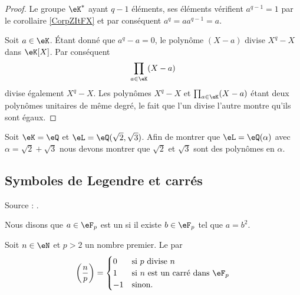 \begin{proof}
    Le groupe \( \eK^*\) ayant \( q-1\) éléments, ses éléments vérifient \( a^{q-1}=1\) par le corollaire \ref{CorpZItFX} et par conséquent \( a^q=aa^{q-1}=a \).

    Soit \( a\in \eK\). Étant donné que \( a^q-a=0\), le polynôme \( (X-a)\) divise \( X^q-X\) dans \( \eK[X]\). Par conséquent 
    \begin{equation}
        \prod_{a\in \eK}(X-a)
    \end{equation}
    divise également \( X^q-X\). Les polynômes \( X^q-X\) et \( \prod_{a\in \eK}(X-a)\) étant deux polynômes unitaires de même degré, le fait que l'un divise l'autre montre qu'ils sont égaux.
\end{proof}

\begin{example}
    Soit \( \eK=\eQ\) et \( \eL=\eQ(\sqrt{2},\sqrt{3})\). Afin de montrer que \( \eL=\eQ(\alpha)\) avec \( \alpha=\sqrt{2}+\sqrt{3}\) nous devons montrer que \( \sqrt{2}\) et \( \sqrt{3}\) sont des polynômes en \( \alpha\).
\end{example}

\subsection{Symboles de Legendre et carrés}

Source : \cite{RecQuadVento}.

Nous disons que \( a\in \eF_p\) est un  si il existe \( b\in \eF_p\) tel que \( a=b^2\).

\begin{definition}
    Soit \( n\in \eN\) et \( p>2\) un nombre premier. Le  par
    \begin{equation}
        \left( \frac{ n }{ p } \right)=\begin{cases}
            0    &   \text{si \( p\) divise \( n\)}\\
            1    &    \text{si \( n\) est un carré dans \( \eF_p\)}\\
            -1    &    \text{sinon}.
        \end{cases}
    \end{equation}
\end{definition}


